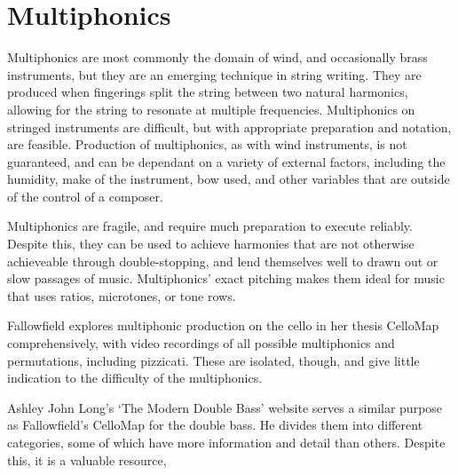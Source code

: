 
\section{Multiphonics}

Multiphonics are most commonly the domain of wind, and occasionally brass instruments, but they are an emerging technique in string writing. 
They are produced when fingerings split the string between two natural harmonics, allowing for the string to resonate at multiple frequencies.
Multiphonics on stringed instruments are difficult, but with appropriate preparation and notation, are feasible. 
Production of multiphonics, as with wind instruments, is not guaranteed, and can be dependant on a variety of external factors, including the humidity, make of the instrument, bow used, and other variables that are outside of the control of a composer. 

Multiphonics are fragile, and require much preparation to execute reliably. 
Despite this, they can be used to achieve harmonies that are not otherwise achieveable through double-stopping, and lend themselves well to drawn out or slow passages of music. 
Multiphonics' exact pitching makes them ideal for music that uses ratios, microtones, or tone rows. 

Fallowfield explores multiphonic production on the cello in her thesis CelloMap comprehensively, with video recordings of all possible multiphonics and permutations, including pizzicati.\autocite{fallowfieldCelloMapHandbook2009} 
These are isolated, though, and give little indication to the difficulty of the multiphonics.

Ashley John Long's `The Modern Double Bass' website serves a similar purpose as Fallowfield's CelloMap for the double bass\autocite{longModernDoubleBass}. 
He divides them into different categories, some of which have more information and detail than others. 
Despite this, it is a valuable resource,

